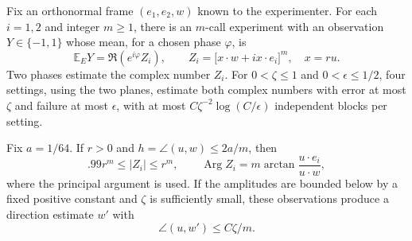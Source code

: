 \begin{lemma}
\label{lem:ghzreadout76}
Fix an orthonormal frame $(e_1,e_2,w)$ known to the experimenter.
For each $i=1,2$ and integer $m\ge1$, there is an $m$-call experiment
with an observation $Y\in\{-1,1\}$ whose mean, for a chosen phase
$\varphi$, is
\begin{equation}\label{eq:ghzreadout76}
 \mathbb E_EY=\Re(e^{i\varphi}Z_i),\qquad
 Z_i=\bigl[x\cdot w+i x\cdot e_i\bigr]^m,
 \quad x=ru.
\end{equation}
Two phases estimate the complex number $Z_i$.  For $0<\zeta\le1$
and $0<\epsilon\le1/2$, four settings, using the two planes,
estimate both complex numbers with error at most $\zeta$ and
failure at most $\epsilon$, with at most
$C\zeta^{-2}\log(C/\epsilon)$ independent blocks per setting.

Fix $a=1/64$.  If $r>0$ and $h=\angle(u,w)\le2a/m$, then
\begin{equation}\label{eq:ghzamplitude76}
 .99r^m\le |Z_i|\le r^m,
 \qquad
 \operatorname{Arg}Z_i
       =m\arctan\frac{u\cdot e_i}{u\cdot w},
\end{equation}
where the principal argument is used.  If the amplitudes are bounded
below by a fixed positive constant and $\zeta$ is sufficiently small,
these observations produce a direction estimate $w'$ with
\begin{equation}\label{eq:ghzphaseerror76}
 \angle(u,w')\le C\zeta/m.
\end{equation}
\end{lemma}

